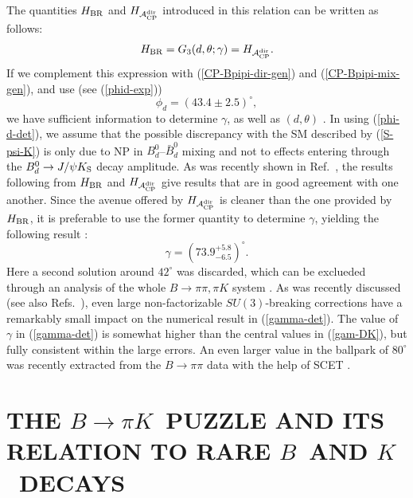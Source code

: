\documentclass[12pt]{article}
\begin{document}
The quantities $H_{\rm BR}$ and $H_{{\cal A}_{\rm CP}^{\rm dir}}$ introduced
in this relation can be written as follows:
\begin{equation}\label{H-fct}
H_{\rm BR} = G_3(d,\theta;\gamma) =
H_{{\cal A}_{\rm CP}^{\rm dir}}.
\end{equation}
If we complement this expression with (\ref{CP-Bpipi-dir-gen}) and
(\ref{CP-Bpipi-mix-gen}), and use (see (\ref{phid-exp}))
\begin{equation}\label{phi-d-det}
\phi_d=(43.4\pm2.5)^\circ,
\end{equation}
we have sufficient information to determine $\gamma$, 
as well as $(d,\theta)$  \cite{RF-BsKK,RF-Bpipi,FleischerMatias}. In using
(\ref{phi-d-det}), we assume that the possible discrepancy with the SM
described by (\ref{S-psi-K}) is only due to NP in $B^0_d$--$\bar B^0_d$ mixing
and not to effects entering through the $B^0_d\to J/\psi K_{\rm S}$ decay amplitude.
As was recently shown in Ref.~\cite{BFRS-5}, the results following from $H_{\rm BR}$ 
and $H_{{\cal A}_{\rm CP}^{\rm dir}}$ give results that are in good agreement with 
one another. Since the avenue offered by $H_{{\cal A}_{\rm CP}^{\rm dir}}$
is cleaner than the one provided by $H_{\rm BR}$, it is preferable to use the former
quantity to determine $\gamma$, yielding the following result \cite{BFRS-5}:
\begin{equation}\label{gamma-det}
\gamma=(73.9^{+5.8}_{-6.5})^\circ.
\end{equation}
Here a second solution around $42^\circ$ was discarded, which can be exclueded 
through an analysis of the whole $B\to\pi\pi,\pi K$ system \cite{BFRS3}. As was recently 
discussed  \cite{BFRS-5} (see also Refs.~\cite{RF-Bpipi,FleischerMatias}), even large 
non-factorizable $SU(3)$-breaking corrections have a remarkably small impact 
on the numerical result in (\ref{gamma-det}). The value of $\gamma$ in 
(\ref{gamma-det}) is somewhat higher than the central values in (\ref{gam-DK}),
but fully consistent within the large errors.  An even larger value in the ballpark of 
$80^\circ$ was recently extracted from the $B\to\pi\pi$ data with the help of SCET 
\cite{gam-SCET,SCET-Bdpi0K0}. 


%
%
%
\section{THE \boldmath$B\to\pi K$\unboldmath~PUZZLE AND ITS RELATION 
TO RARE \boldmath$B$\unboldmath~AND
\boldmath$K$\unboldmath~DECAYS}\label{sec:BpiK-puzzle}
\setcounter{equation}{0}
%
%
%
\end{document}
